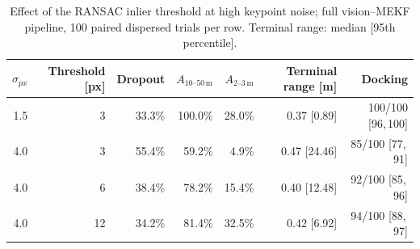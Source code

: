 \begin{table}[!tb]
\caption{Effect of the RANSAC inlier threshold at high keypoint noise; full vision--MEKF
pipeline, 100 paired dispersed trials per row. Terminal range: median [95th percentile].}
\label{tab:threshold}
\centering
\begin{tabular}{rrrrrrr}
\toprule
$\sigma_{px}$ & Threshold [px] & Dropout & $A_{10\text{--}50\,\mathrm{m}}$ & $A_{2\text{--}3\,\mathrm{m}}$ & Terminal range [m] & Docking \\
\midrule
1.5 & 3 & 33.3\% & 100.0\% & 28.0\% & 0.37 [0.89] & 100/100 [96,\,100] \\
4.0 & 3 & 55.4\% & 59.2\% & 4.9\% & 0.47 [24.46] & 85/100 [77,\,91] \\
4.0 & 6 & 38.4\% & 78.2\% & 15.4\% & 0.40 [12.48] & 92/100 [85,\,96] \\
4.0 & 12 & 34.2\% & 81.4\% & 32.5\% & 0.42 [6.92] & 94/100 [88,\,97] \\
\bottomrule
\end{tabular}
\end{table}
